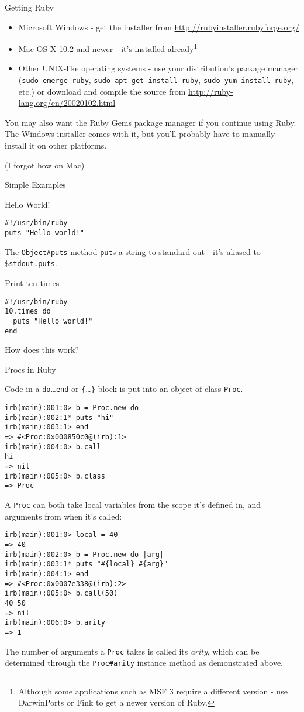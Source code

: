 \documentclass{slides}
\newcommand{\sh}[1]{
	{\Large #1}
	
}
\newcommand{\subh}[1]{
	{\large #1}
	
}
\begin{document}
\begin{slide}
\sh{Getting Ruby}
\begin{itemize}
\item Microsoft Windows - get the installer from \url{http://rubyinstaller.rubyforge.org/}
\item Mac OS X 10.2 and newer - it's installed already\footnote{Although some applications such as MSF 3 require a different version - use DarwinPorts or Fink to get a newer version of Ruby.}
\item Other UNIX-like operating systems - use your distribution's package manager ({\tt sudo emerge ruby}, {\tt sudo apt-get install ruby}, {\tt sudo yum install ruby}, etc.) or download and compile the source from \url{http://ruby-lang.org/en/20020102.html}
\end{itemize}
You may also want the Ruby Gems package manager if you continue using Ruby.  The Windows installer comes with it, but you'll probably have to manually install it on other platforms.

(I forgot how on Mac)
\end{slide}

\begin{slide}
\sh{Simple Examples}

\subh{Hello World!}
\begin{verbatim}
#!/usr/bin/ruby
puts "Hello world!"
\end{verbatim}
The \verb|Object#puts| method  \verb|put|s a string to standard out - it's aliased to \verb!$stdout.puts!.

\subh{Print ten times}
\begin{verbatim}
#!/usr/bin/ruby
10.times do
  puts "Hello world!"
end
\end{verbatim}
How does this work?
\end{slide}
\begin{slide}
\sh{Procs in Ruby}

Code in a \verb|do|\ldots\verb|end| or \verb|{|\ldots\verb|}| block is put into an object of class \verb|Proc|.
\begin{verbatim}
irb(main):001:0> b = Proc.new do
irb(main):002:1* puts "hi"
irb(main):003:1> end
=> #<Proc:0x000850c0@(irb):1>
irb(main):004:0> b.call
hi
=> nil    
irb(main):005:0> b.class
=> Proc
\end{verbatim}
\end{slide}

\begin{slide}
A \verb|Proc| can both take local variables from the scope it's defined in, and arguments from when it's called:
\begin{verbatim}
irb(main):001:0> local = 40
=> 40
irb(main):002:0> b = Proc.new do |arg|
irb(main):003:1* puts "#{local} #{arg}"
irb(main):004:1> end
=> #<Proc:0x0007e338@(irb):2>
irb(main):005:0> b.call(50)
40 50
=> nil
irb(main):006:0> b.arity
=> 1
\end{verbatim}
The number of arguments a \verb|Proc| takes is called its {\em arity}, which can be determined through the \verb|Proc#arity| instance method as demonstrated above.
\end{slide}
\end{document}
